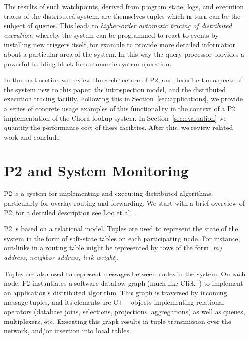 \documentclass{sig-alt-full}
\def\Sys{P2\xspace}
\begin{document}
The results of such watchpoints, derived from program state, logs, and
execution traces of the distributed system, are themselves tuples
which in turn can be the subject of queries.  This leads to
\emph{higher-order automatic tracing of distributed execution},
whereby the system can be programmed to react to events by installing
new triggers itself, for example to provide more detailed information
about a particular area of the system.  In this way the query
processor provides a powerful building block for autonomic system
operation. 

In the next section we review the architecture of \Sys, and
describe the aspects of the system new to this paper: the
introspection model, and the distributed execution tracing facility.
Following this in Section~\ref{sec:applications}, we provide a series
of concrete usage examples of this functionality in the context
of a \Sys implementation of the Chord lookup system.  In
Section~\ref{sec:evaluation} we quantify the performance cost of
these facilities.  After this, we review related work and
conclude. 

\section{\Sys and System Monitoring}
\label{sec:architecture}

\Sys is a system for implementing and
executing distributed algorithms, particularly for overlay routing and 
forwarding.  We start with a brief overview of \Sys; for a detailed
description see Loo et al.~\cite{Loo2005SOSP}.

\Sys is based on a relational model.  Tuples are used to represent
the state of the system in the form of soft-state tables on each
participating node.  For instance, out-links in a routing table might
be represented by rows of the form [\textit{my address, neighbor address, link
  weight}]. 

Tuples are also used to represent messages between
nodes in the system.    On
each node, \Sys instantiates a software dataflow graph (much like
Click~\cite{click-tocs}) to implement an application's distributed
algorithm.  This graph is traversed by incoming message tuples, and its
elements are C++ objects implementing relational operators 
(database joins, selections, projections, aggregations) as well as queues,
multiplexers, etc.  Executing this graph results in tuple transmission
over the network, and/or insertion into local tables.
\end{document}
